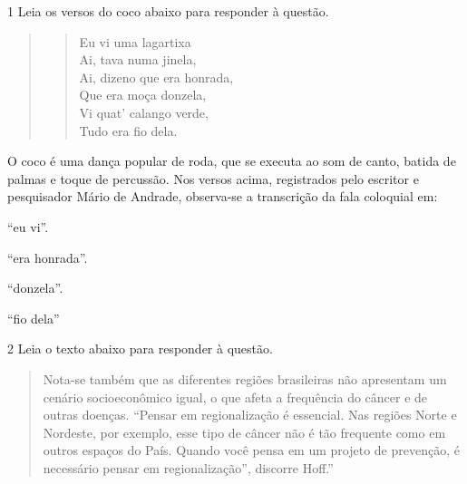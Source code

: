 \num{1} Leia os versos do coco abaixo para responder à questão.

\begin{quote}
\begin{verse}

Eu vi uma lagartixa \\
Ai, tava numa jinela, \\
Ai, dizeno que era honrada, \\
Que era moça donzela, \\
Vi quat' calango verde, \\
Tudo era fio dela. 

\end{verse}
\end{quote}


O coco é uma dança popular de roda, que se executa ao som de canto, batida de palmas e 
toque de percussão. Nos versos acima, registrados pelo escritor e pesquisador Mário de 
Andrade, observa-se a transcrição da fala coloquial em:

\begin{escolha}
  
  \item ``eu vi''.
  
  \item ``era honrada''.
  
  \item ``donzela''.
  
  \item ``fio dela''

\end{escolha}


\num{2} Leia o texto abaixo para responder à questão.

\begin{quote}
Nota-se também que as diferentes regiões brasileiras não apresentam um
cenário socioeconômico igual, o que afeta a frequência do câncer e de
outras doenças. ``Pensar em regionalização é essencial. Nas regiões Norte
e Nordeste, por exemplo, esse tipo de câncer não é tão frequente como em
outros espaços do País. Quando você pensa em um projeto de prevenção, é
necessário pensar em regionalização'', discorre Hoff.''
\end{quote}

